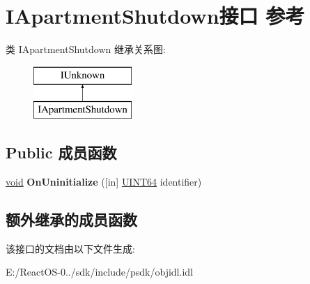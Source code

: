 \hypertarget{interface_i_apartment_shutdown}{}\section{I\+Apartment\+Shutdown接口 参考}
\label{interface_i_apartment_shutdown}
类 I\+Apartment\+Shutdown 继承关系图\+:\begin{figure}[H]
\begin{center}
\leavevmode
\includegraphics[height=2.000000cm]{interface_i_apartment_shutdown}
\end{center}
\end{figure}
\subsection*{Public 成员函数}
\begin{DoxyCompactItemize}
\item 
\mbox{\label{interface_i_apartment_shutdown_a8983ec84e5fe54e2d4c69b13361ef5c8}} 
\hyperlink{interfacevoid}{void} {\bfseries On\+Uninitialize} (\mbox{[}in\mbox{]} \hyperlink{_processor_bind_8h_a57be03562867144161c1bfee95ca8f7c}{U\+I\+N\+T64} identifier)
\end{DoxyCompactItemize}
\subsection*{额外继承的成员函数}


该接口的文档由以下文件生成\+:\begin{DoxyCompactItemize}
\item 
E\+:/\+React\+O\+S-\/0../sdk/include/psdk/objidl.\+idl\end{DoxyCompactItemize}
